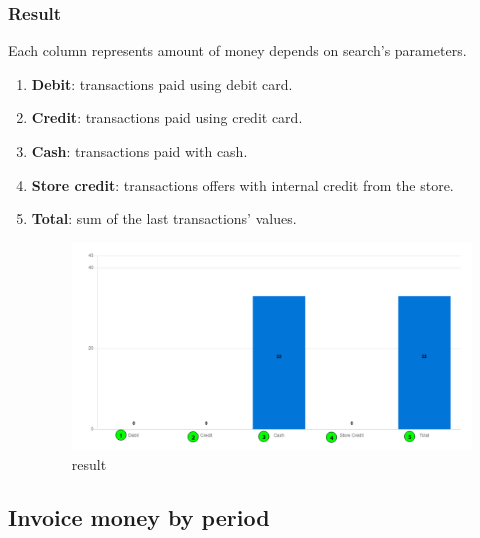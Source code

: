 \documentclass[a4paper,11pt]{refart}
\begin{document}
\subsubsection{Result}\label{section:invoice_money_by_payment_type_result}
Each column represents amount of money depends on search's parameters.
\begin{enumerate}
	\item \textbf{Debit}: transactions paid using debit card.
	\item \textbf{Credit}: transactions paid using credit card.
	\item \textbf{Cash}: transactions paid with cash.
	\item \textbf{Store credit}: transactions offers with internal credit from the store.
	\item \textbf{Total}: sum of the last transactions' values.
	\begin{figure}[H]\centering
		\includegraphics[width=\textwidth]{images/report_invoice_by_payment_type-result1.png}
		\caption{result}
		\label{fig:report_invoice_by_payment_type-result1}
	\end{figure}
\end{enumerate}

\subsection{Invoice money by period}\label{section:invoice_money_by_period}
\end{document}
